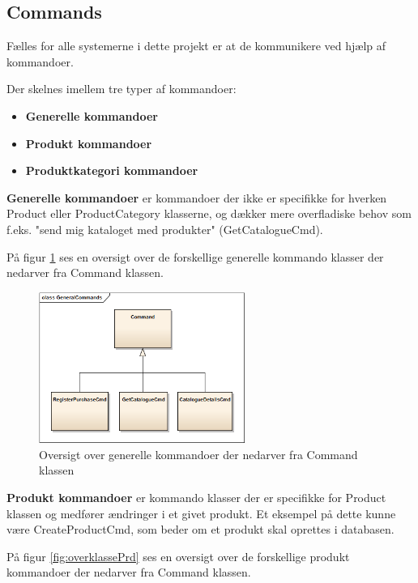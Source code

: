 \subsection{Commands}\label{COMMAND}
Fælles for alle systemerne i dette projekt er at de kommunikere ved hjælp af kommandoer. 

Der skelnes imellem tre typer af kommandoer:

\begin{itemize}
\item \textbf{Generelle kommandoer} 
\item \textbf{Produkt kommandoer} 
\item \textbf{Produktkategori kommandoer}
\end{itemize}

\textbf{Generelle kommandoer} er kommandoer der ikke er specifikke for hverken Product eller ProductCategory klasserne, og dækker mere overfladiske behov som f.eks. "send mig kataloget med produkter" (GetCatalogueCmd).

På figur \ref{fig:overklasseGen} ses en oversigt over de forskellige generelle kommando klasser der nedarver fra Command klassen.

\begin{figure}[H]
    \centering
    \includegraphics[width=0.6\textwidth]{Systemdesign/SharedLib/Images/Commands/GeneralCommands.png}
    \caption{Oversigt over generelle kommandoer der nedarver fra Command klassen}
    \label{fig:overklasseGen}
\end{figure}

\textbf{Produkt kommandoer} er kommando klasser der er specifikke for Product klassen og medfører ændringer i et givet produkt. Et eksempel på dette kunne være CreateProductCmd, som beder om et produkt skal oprettes i databasen.

På figur \ref{fig:overklassePrd} ses en oversigt over de forskellige produkt kommandoer der nedarver fra Command klassen.

